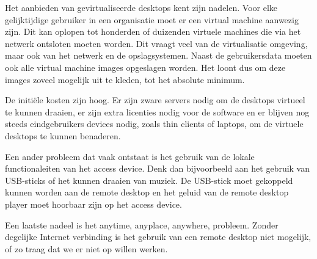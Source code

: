 Het aanbieden van gevirtualiseerde desktops kent zijn nadelen. Voor elke gelijktijdige gebruiker in een organisatie moet er een virtual machine aanwezig zijn. Dit kan oplopen tot honderden of duizenden virtuele machines die via het netwerk ontsloten moeten worden. Dit vraagt veel van de virtualisatie omgeving, maar ook van het netwerk en de opslagsystemen. Naast de gebruikersdata moeten ook alle virtual machine images opgeslagen worden. Het loont dus om deze images zoveel mogelijk uit te kleden, tot het absolute minimum.

De initi\"ele kosten zijn hoog. Er zijn zware servers nodig om de desktops virtueel te kunnen draaien, er zijn extra licenties nodig voor de software en er blijven nog steeds eindgebruikers devices nodig, zoals thin clients of laptops, om de virtuele desktops te kunnen benaderen.

Een ander probleem dat vaak ontstaat is het gebruik van de lokale functionaleiten van het access device. Denk dan bijvoorbeeld aan het gebruik van USB-sticks of het kunnen draaien van muziek. De USB-stick moet gekoppeld kunnen worden aan de remote desktop en het geluid van de remote desktop player moet hoorbaar zijn op het access device.

Een laatste nadeel is het anytime, anyplace, anywhere, probleem. Zonder degelijke Internet verbinding is het gebruik van een remote desktop niet mogelijk, of zo traag dat we er niet op willen werken.

